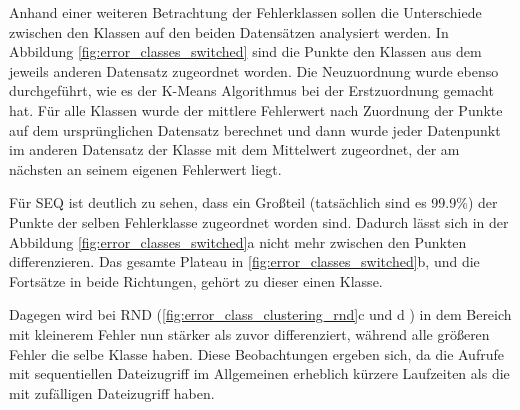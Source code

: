 \documentclass[
	12pt,
	a4paper,
	BCOR10mm,
	DIV14,
	listof=totoc,
	bibliography=totoc,
	headsepline
]{scrreprt}
\begin{document}
Anhand einer weiteren Betrachtung der Fehlerklassen sollen die Unterschiede zwischen den Klassen auf den beiden Datensätzen analysiert werden.
In Abbildung \ref{fig:error_classes_switched} sind die Punkte den Klassen aus dem jeweils anderen Datensatz zugeordnet worden. Die Neuzuordnung wurde ebenso durchgeführt, wie es der K-Means Algorithmus bei der Erstzuordnung gemacht hat.
Für alle Klassen wurde der mittlere Fehlerwert nach Zuordnung der Punkte auf dem ursprünglichen Datensatz berechnet und dann wurde jeder Datenpunkt im anderen Datensatz der Klasse mit dem Mittelwert zugeordnet, der am nächsten an seinem eigenen Fehlerwert liegt.

Für SEQ ist deutlich zu sehen, dass ein Großteil (tatsächlich sind es 99.9\%) der Punkte der selben Fehlerklasse zugeordnet worden sind. Dadurch lässt sich in der Abbildung \ref{fig:error_classes_switched}a nicht mehr zwischen den Punkten differenzieren.
Das gesamte Plateau in \ref{fig:error_classes_switched}b, und die Fortsätze in beide Richtungen, gehört zu dieser einen Klasse.

Dagegen wird bei RND (\ref{fig:error_class_clustering_rnd}c und d )  in dem Bereich mit kleinerem Fehler nun stärker als zuvor differenziert, während alle größeren Fehler die selbe Klasse haben.
Diese Beobachtungen ergeben sich, da die Aufrufe mit sequentiellen Dateizugriff im Allgemeinen erheblich kürzere Laufzeiten als die mit zufälligen Dateizugriff haben.
\end{document}
